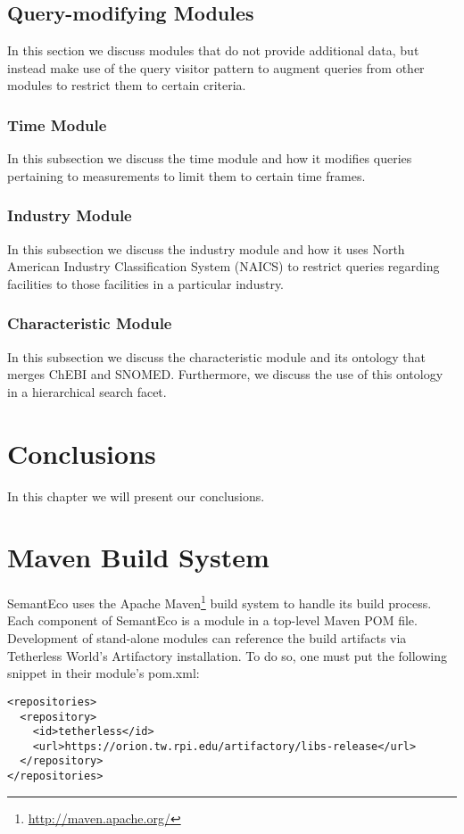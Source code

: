 \documentclass[letterpaper]{report}
\begin{document}
\section{Query-modifying Modules}
In this section we discuss modules that do not provide additional data, but instead make use of the query visitor pattern to augment queries from other modules to restrict them to certain criteria.
\subsection{Time Module}
In this subsection we discuss the time module and how it modifies queries pertaining to measurements to limit them to certain time frames.
\subsection{Industry Module}
In this subsection we discuss the industry module and how it uses North American Industry Classification System (NAICS) to restrict queries regarding facilities to those facilities in a particular industry.
\subsection{Characteristic Module}
In this subsection we discuss the characteristic module and its ontology that merges ChEBI and SNOMED. Furthermore, we discuss the use of this ontology in a hierarchical search facet.
\chapter{Conclusions}
In this chapter we will present our conclusions.

\appendix
\chapter{Maven Build System}
SemantEco uses the Apache Maven\footnote{\url{http://maven.apache.org/}} build system to handle its build process. Each component of SemantEco is a module in a top-level Maven POM file. Development of stand-alone modules can reference the build artifacts via Tetherless World's Artifactory installation. To do so, one must put the following snippet in their module's pom.xml:

\begin{lstlisting}
<repositories>
  <repository>
    <id>tetherless</id>
    <url>https://orion.tw.rpi.edu/artifactory/libs-release</url>
  </repository>
</repositories>
\end{lstlisting}
\end{document}
